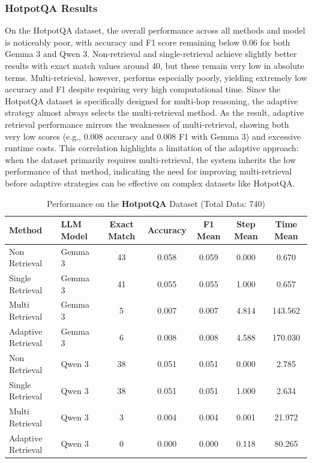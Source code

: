 \documentclass[times]{iapress}
\begin{document}
\subsubsection{HotpotQA Results}
On the HotpotQA dataset, the overall performance across all methods and model is noticeably poor, with accuracy and F1 score remaining below 0.06 for both Gemma 3 and Qwen 3. Non-retrieval and single-retrieval achieve slightly better results with exact match values around 40, but these remain very low in absolute terms. Multi-retrieval, however, performs especially poorly, yielding extremely low accuracy and F1 despite requiring very high computational time. Since the HotpotQA dataset is specifically designed for multi-hop reasoning, the adaptive strategy almost always selects the multi-retrieval method. As the result, adaptive retrieval performance mirrors the weaknesses of multi-retrieval, showing both very low scores (e.g., 0.008 accuracy and 0.008 F1 with Gemma 3) and excessive runtime costs. This correlation highlights a limitation of the adaptive approach: when the dataset primarily requires multi-retrieval, the system inherits the low performance of that method, indicating the need for improving multi-retrieval before adaptive strategies can be effective on complex datasets like HotpotQA.

\begin{table}[htbp]
  \footnotesize
  \caption{Performance on the \textbf{HotpotQA} Dataset (Total Data: 740)}
  \label{tab:hotpotqa_performance}
  \begin{tabularx}{\textwidth}{@{}L L C C C C C@{}}
    \toprule
    \textbf{Method} & \textbf{LLM Model} & \textbf{Exact Match} & \textbf{Accuracy} & \textbf{F1 Mean} & \textbf{Step Mean} & \textbf{Time Mean} \\
    \midrule
    Non Retrieval & Gemma 3 & 43 & 0.058 & 0.059 & 0.000 & 0.670 \\
    Single Retrieval & Gemma 3 & 41 & 0.055 & 0.055 & 1.000 & 0.657 \\
    Multi Retrieval & Gemma 3 & 5 & 0.007 & 0.007 & 4.814 & 143.562 \\
    \midrule
    Adaptive Retrieval & Gemma 3 & 6 & 0.008 & 0.008 & 4.588 & 170.030 \\
    \midrule
    Non Retrieval & Qwen 3 & 38 & 0.051 & 0.051 & 0.000 & 2.785 \\
    Single Retrieval & Qwen 3 & 38 & 0.051 & 0.051 & 1.000 & 2.634 \\
    Multi Retrieval & Qwen 3 & 3 & 0.004 & 0.004 & 0.001 & 21.972 \\
    \midrule
    Adaptive Retrieval & Qwen 3 & 0 & 0.000 & 0.000 & 0.118 & 80.265 \\
    \bottomrule
  \end{tabularx}
\end{table}
\end{document}
